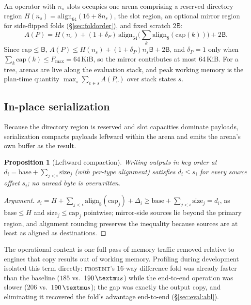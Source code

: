 \documentclass[sigconf,nonacm]{acmart}
\newcommand{\fb}{\textsc{frostbit}}
\newcommand{\us}{\,\textmu s}
\newcommand{\B}{\ensuremath{\mathsf{B}}}
\newcommand{\capm}{\ensuremath{\mathrm{cap}}}
\newtheorem{propx}{Proposition}
\begin{document}
An operator with $n_s$ slots occupies one arena comprising a reserved
directory region $H(n_s) = \mathrm{align}_{64}(16 + 8n_s)$, the slot
region, an optional mirror region for side-flipped folds
(\S\ref{sec:foldorder}), and fixed scratch $2\B$:
\begin{equation}
\label{eq:arena}
A(P) = H(n_s) + (1{+}\delta_P)\,
\mathrm{align}_{64}\!\Big(\textstyle\sum_{k}
\mathrm{align}_8(\capm(k))\Big) + 2\B .
\end{equation}
Since $\capm \le \B$, $A(P) \le H(n_s) + (1{+}\delta_P)n_s\B + 2\B$, and
$\delta_P = 1$ only when $\sum_k \capm(k) \le F_{\max} = 64$\,KiB, so
the mirror contributes at most 64\,KiB. For a tree, arenas are live
along the evaluation stack, and peak working memory is the plan-time
quantity $\max_{s} \sum_{v \in s} A(P_v)$ over stack states $s$.

\subsection{In-place serialization}
\label{sec:inplace}

Because the directory region is reserved and slot capacities dominate
payloads, serialization compacts payloads leftward within the arena and
emits the arena's own buffer as the result.

\begin{propx}[Leftward compaction]
\label{prop:inplace}
Writing outputs in key order at
$d_i = \mathrm{base} + \sum_{j<i}\mathrm{size}_j$ (with per-type
alignment) satisfies $d_i \le s_i$ for every source offset $s_i$; no
unread byte is overwritten.
\end{propx}

\begin{proof}[Argument]
$s_i = H + \sum_{j<i}\mathrm{align}_8(\capm_j) + \Delta_i \ge
\mathrm{base} + \sum_{j<i}\mathrm{size}_j = d_i$, as
$\mathrm{base} \le H$ and $\mathrm{size}_j \le \capm_j$ pointwise;
mirror-side sources lie beyond the primary region, and alignment
rounding preserves the inequality because sources are at least as
aligned as destinations.
\end{proof}

The operational content is one full pass of memory traffic removed
relative to engines that copy results out of working memory.
Profiling during development isolated this term directly: \fb's 16-way
difference fold was already faster than the baseline ($185$ vs.\
$190\us$) while the end-to-end operation was slower ($206$ vs.\
$190\us$); the gap was exactly the output copy, and eliminating it
recovered the fold's advantage end-to-end (\S\ref{sec:eval:abl}).
\end{document}
